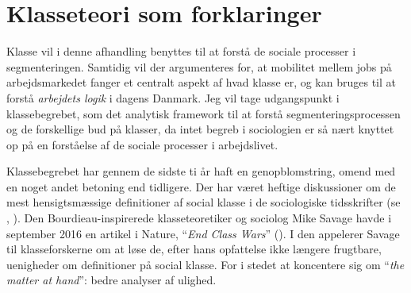 






\chapter{Klasseteori som forklaringer \label{kapitel_teori_klasse}}

Klasse vil i denne afhandling benyttes til at forstå de sociale processer i segmenteringen. Samtidig vil der argumenteres for, at mobilitet mellem jobs på arbejdsmarkedet fanger et centralt aspekt af hvad klasse er, og kan bruges til at forstå \emph{arbejdets logik} i dagens Danmark. Jeg vil tage udgangspunkt i klassebegrebet, som det analytisk framework til at forstå segmenteringsprocessen  og de forskellige bud på klasser, da intet begreb i sociologien er så nært knyttet op på en forståelse af de sociale processer i arbejdslivet. 

Klassebegrebet har gennem de sidste ti år haft en genopblomstring, omend med en noget andet betoning end tidligere. %
Der har været heftige diskussioner om de mest hensigtsmæssige definitioner af social klasse i de sociologiske tidsskrifter (se \cite{Grusky2001}, \cite{Goldthorpe2002}). Den Bourdieau-inspirerede klasseteoretiker og sociolog Mike Savage havde i september 2016 en artikel i Nature, “\emph{End Class Wars}” (\citeyear{Savage2016}). I den appelerer Savage til klasseforskerne om at løse de, efter hans opfattelse ikke længere frugtbare, uenigheder om definitioner på social klasse. For i stedet at koncentere sig om “\emph{the matter at hand}”: bedre analyser af ulighed. 

